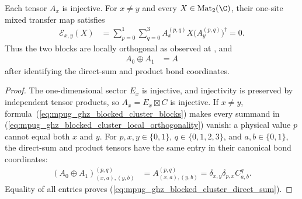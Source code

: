 \begin{lemma}
    \label{thm:mpug_ghz_blocked_cluster_blocks}
    \leanok
    Each tensor $A_x$ is injective. For $x\neq y$ and every
    $X\in\operatorname{Mat}_2(\C)$, their one-site mixed transfer map satisfies
    \begin{align}
        \mathcal E_{x,y}(X)
         & =\sum_{p=0}^1\sum_{q=0}^3
        A_x^{(p,q)}X\bigl(A_y^{(p,q)}\bigr)^\dagger
        =0.
        \label{eq:mpug_ghz_blocked_cluster_local_orthogonality}
    \end{align}
    Thus the two blocks are locally orthogonal as observed at
    \cite[line~4481]{FrancoRubio2025MPUGauging}, and
    \begin{align}
        A_0\oplus A_1 & =A
        \label{eq:mpug_ghz_blocked_cluster_direct_sum}
    \end{align}
    after identifying the direct-sum and product bond
    coordinates.
\end{lemma}

\begin{proof}\leanok
    The one-dimensional sector $E_x$ is injective, and injectivity is preserved
    by independent tensor products, so $A_x=E_x\boxtimes C$ is injective.
    If $x\neq y$, formula~(\ref{eq:mpug_ghz_blocked_cluster_blocks}) makes
    every summand in
    (\ref{eq:mpug_ghz_blocked_cluster_local_orthogonality}) vanish: a physical
    value $p$ cannot equal both $x$ and $y$. For $p,x,y\in\{0,1\}$,
    $q\in\{0,1,2,3\}$, and $a,b\in\{0,1\}$, the direct-sum and product tensors
    have the same entry in their canonical bond coordinates:
    \begin{align}
        (A_0\oplus A_1)^{(p,q)}_{(x,a),(y,b)}
         & =A^{(p,q)}_{(x,a),(y,b)}
        =\delta_{x,y}\delta_{p,x}C^q_{a,b}.
    \end{align}
    Equality of all entries proves
    (\ref{eq:mpug_ghz_blocked_cluster_direct_sum}).
\end{proof}

